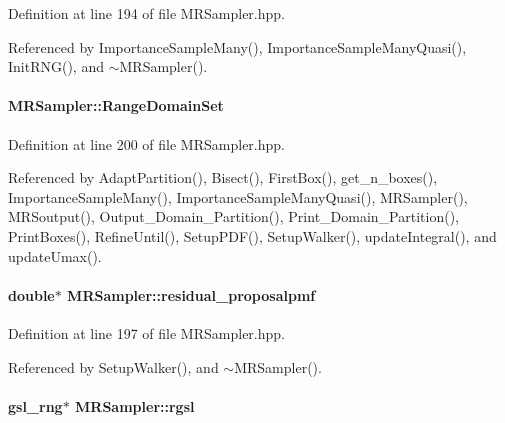 \-Definition at line 194 of file \-M\-R\-Sampler.\-hpp.



\-Referenced by \-Importance\-Sample\-Many(), \-Importance\-Sample\-Many\-Quasi(), \-Init\-R\-N\-G(), and $\sim$\-M\-R\-Sampler().

\hypertarget{classMRSampler_aec967af4872910cd04b49227d843ec66}{
\paragraph[{\-Range\-Domain\-Set}]{ {\bf \-M\-R\-Sampler\-::\-Range\-Domain\-Set}}}\label{classMRSampler_aec967af4872910cd04b49227d843ec66}


\-Definition at line 200 of file \-M\-R\-Sampler.\-hpp.



\-Referenced by \-Adapt\-Partition(), \-Bisect(), \-First\-Box(), get\-\_\-n\-\_\-boxes(), \-Importance\-Sample\-Many(), \-Importance\-Sample\-Many\-Quasi(), \-M\-R\-Sampler(), \-M\-R\-Soutput(), \-Output\-\_\-\-Domain\-\_\-\-Partition(), \-Print\-\_\-\-Domain\-\_\-\-Partition(), \-Print\-Boxes(), \-Refine\-Until(), \-Setup\-P\-D\-F(), \-Setup\-Walker(), update\-Integral(), and update\-Umax().

\hypertarget{classMRSampler_adf347c7e241dda4ccd20e8d661da5e72}{
\paragraph[{residual\-\_\-proposalpmf}]{\setlength{\rightskip}{0pt plus 5cm}double$\ast$ {\bf \-M\-R\-Sampler\-::residual\-\_\-proposalpmf}}}\label{classMRSampler_adf347c7e241dda4ccd20e8d661da5e72}


\-Definition at line 197 of file \-M\-R\-Sampler.\-hpp.



\-Referenced by \-Setup\-Walker(), and $\sim$\-M\-R\-Sampler().

\hypertarget{classMRSampler_a83ea740a453f9274eb77909ba0573a97}{
\paragraph[{rgsl}]{\setlength{\rightskip}{0pt plus 5cm}gsl\-\_\-rng$\ast$ {\bf \-M\-R\-Sampler\-::rgsl}}}\label{classMRSampler_a83ea740a453f9274eb77909ba0573a97}



